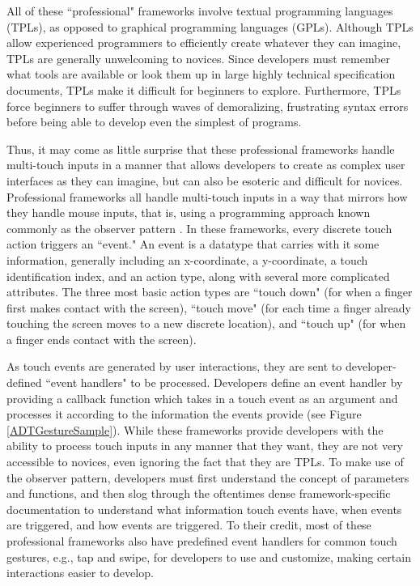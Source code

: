 All of these ``professional" frameworks involve textual programming languages (TPLs), as opposed to graphical programming languages (GPLs). Although TPLs allow experienced programmers to efficiently create whatever they can imagine, TPLs are generally unwelcoming to novices. Since developers must remember what tools are available or look them up in large highly technical specification documents, TPLs make it difficult for beginners to explore. Furthermore, TPLs  force beginners to suffer through waves of demoralizing, frustrating syntax errors before being able to develop even the simplest of programs.

Thus, it may come as little surprise that these professional frameworks handle multi-touch inputs in a manner that allows developers to create as complex user interfaces as they can imagine, but can also be esoteric and difficult for novices. Professional frameworks all handle multi-touch inputs in a way that mirrors how they handle mouse inputs, that is, using a programming approach known commonly as the observer pattern \cite{Gamma}. In these frameworks, every discrete touch action triggers an ``event." An event is a datatype that carries with it some information, generally including an x-coordinate, a y-coordinate, a touch identification index, and an action type, along with several more complicated attributes. The three most basic action types are ``touch down" (for when a finger first makes contact with the screen), ``touch move" (for each time a finger already touching the screen moves to a new discrete location), and ``touch up" (for when a finger ends contact with the screen).

As touch events are generated by user interactions, they are sent to developer-defined ``event handlers" to be processed. Developers define an event handler by providing a callback function which takes in a touch event as an argument and processes it according to the information the events provide (see Figure \ref{ADTGestureSample}). While these frameworks provide developers with the ability to process touch inputs in any manner that they want, they are not very accessible to novices, even ignoring the fact that they are TPLs. To make use of the observer pattern, developers must first understand the concept of parameters and functions, and then slog through the oftentimes dense framework-specific documentation to understand what information touch events have, when events are triggered, and how events are triggered. To their credit, most of these professional frameworks also have predefined event handlers for common touch gestures, e.g., tap and swipe, for developers to use and customize, making certain interactions easier to develop.

